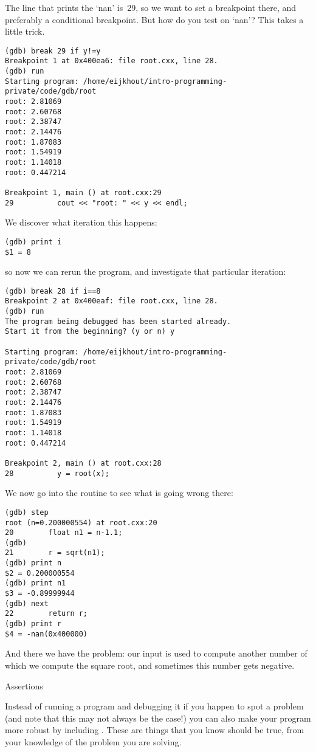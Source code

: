 The line that prints the `nan' is~29, so we want to set a breakpoint there,
and preferably a conditional breakpoint.
But how do you test on `nan'? This takes a little trick.
\begin{verbatim}
(gdb) break 29 if y!=y
Breakpoint 1 at 0x400ea6: file root.cxx, line 28.
(gdb) run
Starting program: /home/eijkhout/intro-programming-private/code/gdb/root
root: 2.81069
root: 2.60768
root: 2.38747
root: 2.14476
root: 1.87083
root: 1.54919
root: 1.14018
root: 0.447214

Breakpoint 1, main () at root.cxx:29
29          cout << "root: " << y << endl;
\end{verbatim}
We discover what iteration this happens:
\begin{verbatim}
(gdb) print i
$1 = 8
\end{verbatim}
so now we can rerun the program, and investigate that particular iteration:
\begin{verbatim}
(gdb) break 28 if i==8
Breakpoint 2 at 0x400eaf: file root.cxx, line 28.
(gdb) run
The program being debugged has been started already.
Start it from the beginning? (y or n) y

Starting program: /home/eijkhout/intro-programming-private/code/gdb/root
root: 2.81069
root: 2.60768
root: 2.38747
root: 2.14476
root: 1.87083
root: 1.54919
root: 1.14018
root: 0.447214

Breakpoint 2, main () at root.cxx:28
28          y = root(x);
\end{verbatim}
We now go into the  routine to see what is going wrong there:
\begin{verbatim}
(gdb) step
root (n=0.200000554) at root.cxx:20
20        float n1 = n-1.1;
(gdb)
21        r = sqrt(n1);
(gdb) print n
$2 = 0.200000554
(gdb) print n1
$3 = -0.89999944
(gdb) next
22        return r;
(gdb) print r
$4 = -nan(0x400000)
\end{verbatim}
And there we have the problem: our input  is used to compute
another number  of which we compute the square root,
and sometimes this number gets negative.

 {Assertions}

Instead of running a program and debugging it if you happen to spot a problem
(and note that this may not always be the case!)
you can also make your program more robust by including .
These are things that you know should be true,
from your knowledge of the problem you are solving.

